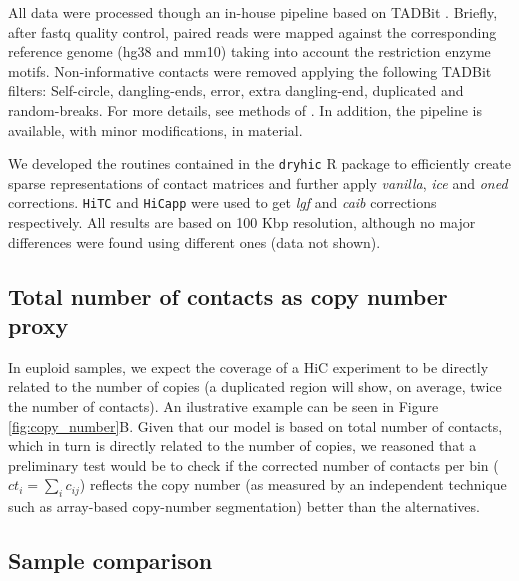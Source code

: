 \documentclass{bioinfo}
\begin{document}
\begin{methods}
All data were processed though an in-house pipeline based on TADBit \citep{serra2016structural}. Briefly, after fastq quality control, paired reads were mapped against the corresponding reference genome (hg38 and mm10) taking into account the restriction enzyme motifs. Non-informative contacts were removed applying the following TADBit \citep{serra2016structural} filters: Self-circle, dangling-ends, error, extra dangling-end, duplicated and random-breaks. For more details, see methods of \cite{stadhouders2017transcription}. In addition, the pipeline is available, with minor modifications, in \cite{quilez2017managing} material.

We developed the routines contained in the \texttt{dryhic} R package to efficiently create sparse representations of contact matrices and further apply \textit{vanilla}, \textit{ice} and \textit{oned} corrections. \texttt{HiTC} \citep{servant2012hitc} and \texttt{HiCapp} \citep{wu2016computational} were used to get \textit{lgf} and \textit{caib} corrections respectively. All results are based on 100 Kbp resolution, although no major differences were found using different ones (data not shown).


\subsection{Total number of contacts as copy number proxy}

In euploid samples, we expect the coverage of a HiC experiment to be directly related to the number of copies (a duplicated region will show, on average, twice the number of contacts). An ilustrative example can be seen in Figure \ref{fig:copy_number}B. Given that our model is based on total number of contacts, which in turn is directly related to the number of copies, we reasoned that a preliminary test would be to check if the corrected number of contacts per bin ($ct_i = \sum_{i}{c_{ij}}$) reflects the copy number (as measured by an independent technique such as array-based copy-number segmentation) better than the alternatives.


\subsection{Sample comparison}


\end{methods}
\end{document}
